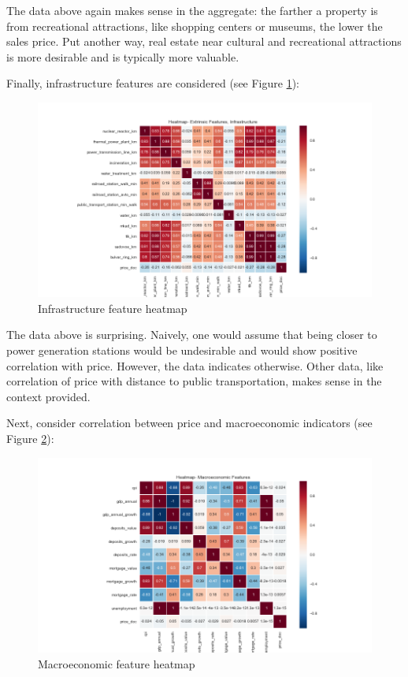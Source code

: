 \documentclass[12pt]{article}
\theoremstyle{plain} %
\theoremstyle{definition} %
\theoremstyle{remark} %
\begin{document}
The data above again makes sense in the aggregate: the farther a property is from recreational attractions, like shopping centers or museums, the lower the sales price.  Put another way, real estate near cultural and recreational attractions is more desirable and is typically more valuable.

Finally, infrastructure features are considered (see Figure \ref{fig:eleven}):

\begin{figure}[h!]
\begin{center}
\includegraphics[width=15cm]{./output_images/infrastructure_heatmap.png}
\caption{Infrastructure feature heatmap}
\label{fig:eleven}
\end{center}
\end{figure}

The data above is surprising.  Naively, one would assume that being closer to power generation stations would be undesirable and would show positive correlation with price.  However, the data indicates otherwise.  Other data, like correlation of price with distance to public transportation, makes sense in the context provided.

Next, consider correlation between price and macroeconomic indicators  (see Figure \ref{fig:twelve}):

\begin{figure}[h!]
\begin{center}
\includegraphics[width=15cm]{./output_images/macro_heatmap.png}
\caption{Macroeconomic feature heatmap}
\label{fig:twelve}
\end{center}
\end{figure}
\end{document}
